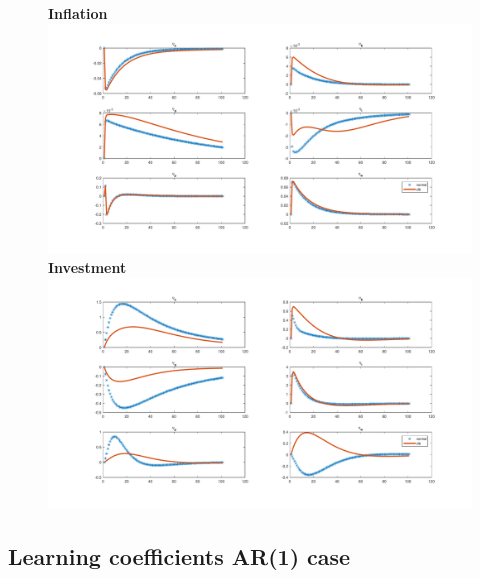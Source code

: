 \documentclass[12pt,reqno]{article}
\numberwithin{equation}{section}
\begin{document}
\begin{figure}[H]
\textbf{Inflation}\\
\includegraphics[scale=0.4]{rise_impresp_pinf.pdf}\\
\textbf{Investment}\\
\includegraphics[scale=0.4]{rise_impresp_inve.pdf}\\
\end{figure}

\subsection*{Learning coefficients AR(1) case}
\end{document}
